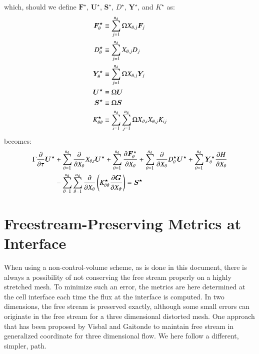 \documentclass{warpdoc}
\newcommand{\alb}{\vspace{0.2cm}\\} %
\newcommand{\nd}{{{n}_{\rm d}}}
\renewcommand{\vec}[1]{\bm{#1}}
\begin{document}
%
which, should we define $\vec{F}^\star$, $\vec{U}^\star$, $\vec{S}^\star$, $D^\star$, $\vec{Y}^\star$, and $K^\star$ as:
%
\begin{align}
  \vec{F}^\star_\theta &\equiv \sum_{j=1}^\nd  \Omega X_{\theta,j} \vec{F}_j \label{eqn:Fstar}\alb
       D^\star_\theta &\equiv \sum_{j=1}^\nd  X_{\theta,j} D_j \label{eqn:Dstar}\alb
  \vec{Y}^\star_\theta &\equiv \sum_{j=1}^\nd  \Omega X_{\theta,j} \vec{Y}_j \label{eqn:Ystar}\alb
  \vec{U}^\star &\equiv \Omega\vec{U} \label{eqn:Ustar}\alb
  \vec{S}^\star &\equiv \Omega\vec{S} \label{eqn:Sstar}\alb
  K^\star_{\theta\vartheta} &\equiv \sum_{i=1}^\nd \sum_{j=1}^\nd \Omega  X_{\vartheta,i} X_{\theta,j} K_{ij} \label{eqn:Kstar}
\end{align}
%
becomes:
%
\begin{align}
    \Gamma \frac{\partial }{\partial \tau} \vec{U}^\star
    &+ \sum_{\theta=1}^\nd  \frac{\partial }{\partial X_\theta} X_{\theta,t} \vec{U}^\star
    +  \sum_{\theta=1}^\nd \frac{\partial \vec{F}^\star_\theta}{\partial X_\theta} 
    +  \sum_{\theta=1}^\nd \frac{\partial }{\partial X_\theta} D^\star_\theta \vec{U}^\star
    +  \sum_{\theta=1}^\nd \vec{Y}_\theta^\star \frac{\partial H}{\partial X_\theta}\nonumber\alb
    &-  \sum_{\theta=1}^\nd \sum_{\vartheta=1}^\nd
       \frac{\partial}{\partial X_\theta}
       \left( K^\star_{\theta\vartheta} \frac{\partial \vec{G}}{\partial X_\vartheta} \right)
    = \vec{S}^\star
 \label{eqn:goveq10}
\end{align}
%





\section{Freestream-Preserving Metrics at Interface}

When using a non-control-volume scheme, as is done in this document, there is always
a possibility of not conserving the free stream properly on a highly stretched mesh.
To minimize such an error, the metrics are here determined at the cell interface each
time the flux at the interface is computed. In two dimensions, the free stream is preserved
exactly, although some small errors can originate in the free stream for a three dimensional
distorted mesh. One approach that has been proposed by Visbal and Gaitonde
\cite{jcp:2002:visbal} to maintain free stream in generalized coordinate for three dimensional
flow. We here follow a different, simpler, path.
\end{document}

